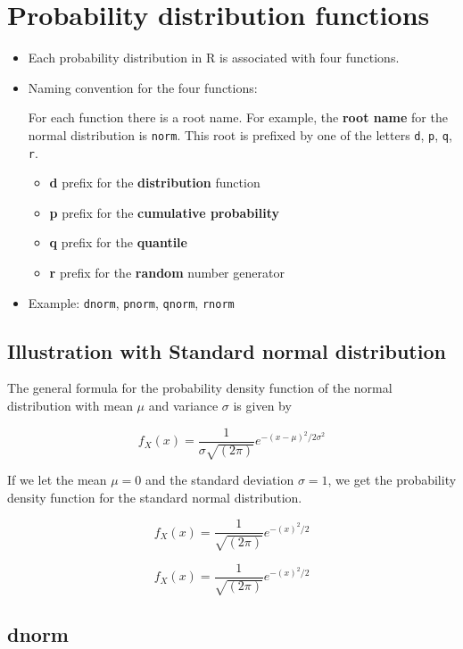\documentclass[
  letterpaper,
  DIV=11,
  numbers=noendperiod]{scrreprt}
\begin{document}
\section{Probability distribution
functions}\label{probability-distribution-functions}

\begin{itemize}
\item
  Each probability distribution in R is associated with four functions.
\item
  Naming convention for the four functions:

  For each function there is a root name. For example, the \textbf{root
  name} for the normal distribution is \texttt{norm}. This root is
  prefixed by one of the letters \texttt{d}, \texttt{p}, \texttt{q},
  \texttt{r}.

  \begin{itemize}
  \item
    \textbf{d} prefix for the \textbf{distribution} function
  \item
    \textbf{p} prefix for the \textbf{cumulative probability}
  \item
    \textbf{q} prefix for the \textbf{quantile}
  \item
    \textbf{r} prefix for the \textbf{random} number generator
  \end{itemize}
\item
  Example: \texttt{dnorm}, \texttt{pnorm}, \texttt{qnorm},
  \texttt{rnorm}
\end{itemize}

\subsection{Illustration with Standard normal
distribution}\label{illustration-with-standard-normal-distribution}

The general formula for the probability density function of the normal
distribution with mean \(\mu\) and variance \(\sigma\) is given by

\[
f_X(x) = \frac{1}{\sigma\sqrt{(2\pi)}} e^{-(x-\mu)^2/2\sigma^2}
\]

If we let the mean \(\mu=0\) and the standard deviation \(\sigma=1\), we
get the probability density function for the standard normal
distribution.

\[
f_X(x) = \frac{1}{\sqrt{(2\pi)}} e^{-(x)^2/2}
\]

\[
f_X(x) = \frac{1}{\sqrt{(2\pi)}} e^{-(x)^2/2}
\]

\subsection{dnorm}\label{dnorm}
\end{document}
